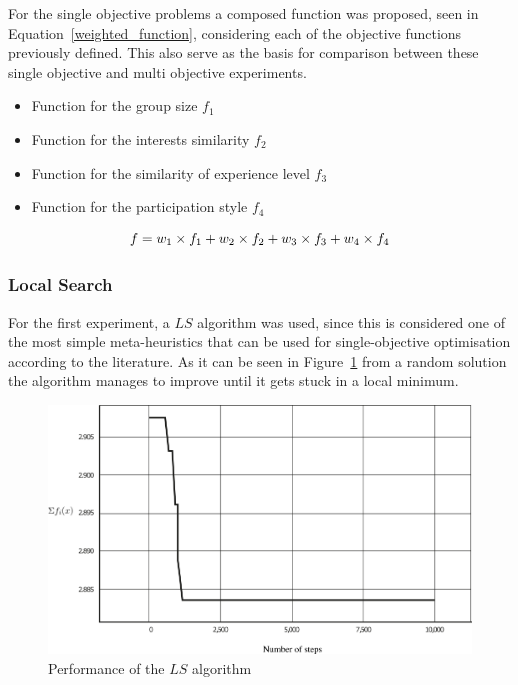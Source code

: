 For the single objective problems a composed function was proposed, seen in Equation~\ref{weighted_function}, considering each of the objective functions previously defined. This also serve as the basis for comparison between these single objective and multi objective experiments.\\

\begin{itemize}
\item Function for the group size \(f_{1}\)
\item Function for the interests similarity \(f_{2}\)
\item Function for the similarity of experience level \(f_{3}\)
\item Function for the participation style \(f_{4}\)
\end{itemize}

\begin{equation} \label{weighted_function}
    f = w_{1} \times f_{1} + \\
    w_{2} \times f_{2} + \\
    w_{3} \times f_{3} + \\
    w_{4} \times f_{4}
\end{equation}

\subsubsection{Local Search}

For the first experiment, a $LS$ algorithm was used, since this is considered one of the most simple meta-heuristics that can be used for single-objective optimisation according to the literature. As it can be seen in Figure~\ref{fig:local_search} from a random solution the algorithm manages to improve until it gets stuck in a local minimum.

\begin{figure}
    \centering
    \includegraphics[width=\textwidth]{images/local_search.png}
    \caption{Performance of the $LS$ algorithm}
    \label{fig:local_search}
\end{figure}

